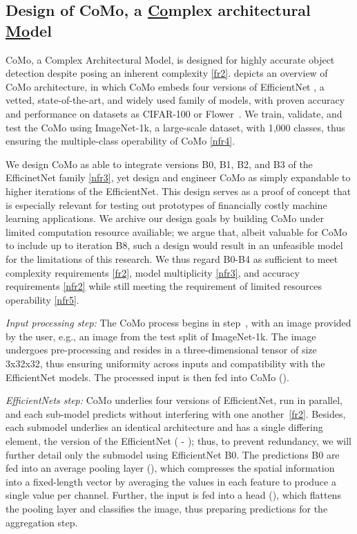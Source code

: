 


\subsection{Design of CoMo, a \underline{Co}mplex architectural \underline{Mo}del}\label{sec:design:como}

CoMo, a Complex Architectural Model, is designed for highly accurate object detection despite posing an inherent complexity \ref{fr2}.  depicts an overview of CoMo architecture, in which CoMo embeds four versions of EfficientNet \cite{tan_efficientnet_2020}, a vetted, state-of-the-art, and widely used family of models, with proven accuracy and performance on datasets as CIFAR-100 or Flower~\cite{DBLP:conf/icml/TanL19}. We train, validate, and test the CoMo using ImageNet-1k\cite{DBLP:conf/cvpr/DengDSLL009}, a large-scale dataset, with 1,000 classes, thus ensuring the multiple-class operability of CoMo \ref{nfr4}.

We design CoMo as able to integrate versions B0, B1, B2, and B3 of the EfficinetNet family \ref{nfr3}, yet design and engineer CoMo as simply expandable to higher iterations of the EfficientNet. This design serves as a proof of concept that is especially relevant for testing out prototypes of financially costly machine learning applications. We archive our design goals by building CoMo under limited computation resource availiable; we argue that, albeit valuable for CoMo to include up to iteration B8, such a design would result in an unfeasible model for the limitations of this research. We thus regard B0-B4 as sufficient to meet complexity requirements \ref{fr2}, model multiplicity \ref{nfr3}, and accuracy requirements \ref{nfr2} while still meeting the requirement of limited resources operability \ref{nfr5}.

\textit{Input processing step:} The CoMo process begins in step~, with an image provided by the user, e.g., an image from the test split of ImageNet-1k. The image undergoes pre-processing and resides in a three-dimensional tensor of size 3x32x32, thus ensuring uniformity across inputs and compatibility with the EfficientNet models. The processed input is then fed into CoMo ().

\textit{EfficientNets step:} CoMo underlies four versions of EfficientNet, run in parallel, and each sub-model predicts without interfering with one another~\ref{fr2}. Besides, each submodel underlies an identical architecture and has a single differing element, the version of the EfficientNet ( - ); thus, to prevent redundancy, we will further detail only the submodel using EfficientNet B0. The predictions B0 are fed into an average pooling layer (), which compresses the spatial information into a fixed-length vector by averaging the values in each feature to produce a single value per channel. Further, the input is fed into a head (), which flattens the pooling layer and classifies the image, thus preparing predictions for the aggregation step.


